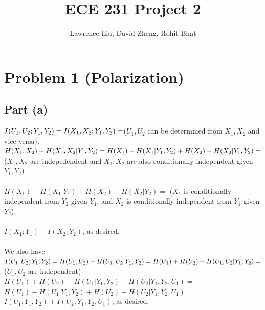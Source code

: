 \documentclass[a4paper,10pt]{article}
\title{ECE 231 Project 2}
\author{Lawrence Liu, David Zheng, Rohit Bhat}
\begin{document}
\maketitle


\section{Problem 1 (Polarization)}
\subsection{Part (a)}
$I(U_1, U_2; Y_1, Y_2) = \\
I(X_1, X_2; Y_1, Y_2)=$\qquad($U_1, U_2$ can be determined from $X_1, X_2$ and vice versa).\\
$H(X_1, X_2) -H(X_1, X_2|Y_1, Y_2)=\\ \\
H(X_1)-H(X_1|Y_1, Y_2) + H(X_2) - H(X_2|Y_1, Y_2)=$ \qquad ($X_1, X_2$ are indepedendent and $X_1, X_2$ are also conditionally independent given $Y_1, Y_2$)\\ \\
$H(X_1) - H(X_1|Y_1) + H(X_2) - H(X_2| Y_2)=$ \qquad ($X_1$ is conditionally independent from $Y_2$ given $Y_1$, and $X_2$ is conditionally independent from $Y_1$ given $Y_2$). \\ \\
$I(X_1; Y_1) + I(X_2; Y_2)$, as desired.\\ \\
We also have:\\
$I(U_1, U_2; Y_1, Y_2) = \\
H(U_1, U_2) - H(U_1, U_2 | Y_1, Y_2) = \\
H(U_1) + H(U_2) - H(U_1, U_2 | Y_1, Y_2)  = $\qquad($U_1, U_2$ are independent)\\
$H(U_1)+H(U_2) - H(U_1|Y_1, Y_2) - H(U_2 | Y_1, Y_2, U_1) = $\\
$H(U_1) - H(U_1|Y_1, Y_2)+H(U_2) - H(U_2 | Y_1, Y_2, U_1) = $\\
$I(U_1; Y_1, Y_2) + I(U_2; Y_1, Y_2, U_1)$, as desired.\\
\end{document}

